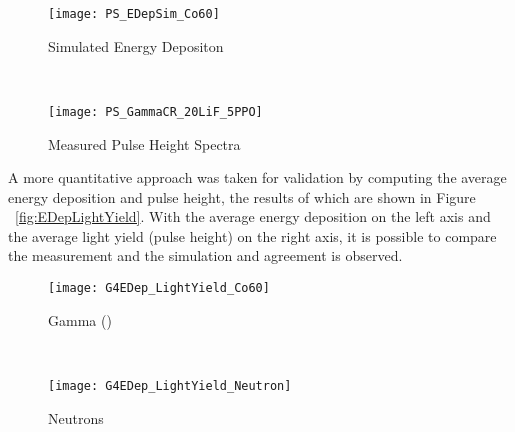 \documentclass[draftcls,onecolumn]{IEEEtran}
\begin{document}
\begin{figure*}[ht]
	\centering
	\begin{subfigure}[b]{0.45\figurewidth}
    		\texttt{[image: PS\_EDepSim\_Co60]}
		\caption{Simulated Energy Depositon}
	\end{subfigure}%
	~
	\begin{subfigure}[b]{0.45\figurewidth}
    \texttt{[image: PS\_GammaCR\_20LiF\_5PPO]}
		\caption{Measured Pulse Height Spectra}
	\end{subfigure}%
	\caption{Comparison of the energy deposition and pulse height spectra for validation. The spectra have the same shape, indicating agreement. The frabricated films greater than \SI{600}{\um} were of poor optical quality and therefore their results are not shown.}
	\label{fig:spectraComparisonGamma}
\end{figure*}
A more quantitative approach was taken for validation by computing the average energy deposition and pulse height, the results of which are shown in Figure ~\ref{fig:EDepLightYield}. 
With the average energy deposition on the left axis and the average light yield (pulse height) on the right axis, it is possible to compare the measurement and the simulation and agreement is observed.
\begin{figure*}[ht]
	\centering
	\begin{subfigure}[b]{0.45\figurewidth}
    		\texttt{[image: G4EDep\_LightYield\_Co60]}
		\caption{Gamma ()}
	\end{subfigure}%
	~
	\begin{subfigure}[b]{0.45\figurewidth}
    		\texttt{[image: G4EDep\_LightYield\_Neutron]}
		\caption{Neutrons}
	\end{subfigure}%
	\caption{Average Energy Deposition and Measured Light Yield}
	\label{fig:EDepLightYield}
\end{figure*}
\end{document}
